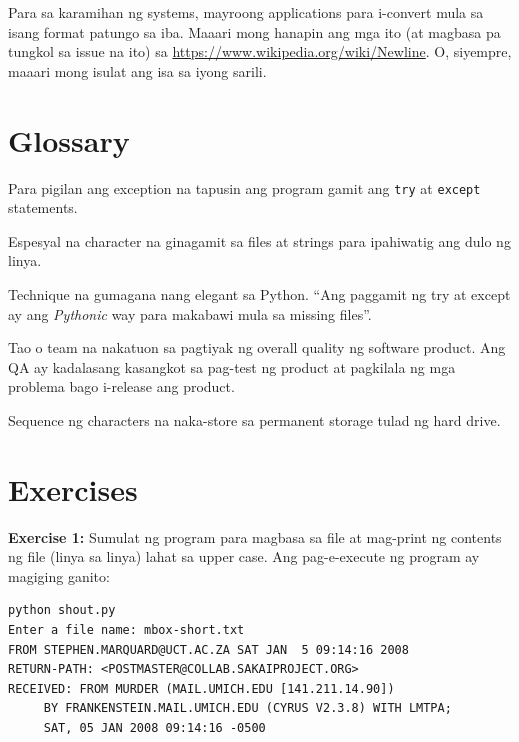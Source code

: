 \documentclass[10pt,]{book}
\providecommand{\tightlist}{%
  \setlength{\itemsep}{0pt}\setlength{\parskip}{0pt}}
\begin{document}

Para sa karamihan ng systems, mayroong applications para i-convert mula
sa isang format patungo sa iba. Maaari mong hanapin ang mga ito (at
magbasa pa tungkol sa issue na ito) sa
\href{https://wikipedia.org/wiki/Newline}{https://www.wikipedia.org/wiki/Newline}.
O, siyempre, maaari mong isulat ang isa sa iyong sarili.

\section{Glossary}\label{glossary-6}

\begin{description}
\tightlist
\item[catch]
Para pigilan ang exception na tapusin ang program gamit ang \texttt{try}
at \texttt{except} statements. 
\item[newline]
Espesyal na character na ginagamit sa files at strings para ipahiwatig
ang dulo ng linya. 
\item[Pythonic]
Technique na gumagana nang elegant sa Python. ``Ang paggamit ng try at
except ay ang \emph{Pythonic} way para makabawi mula sa missing files''.
\item[Quality Assurance]
Tao o team na nakatuon sa pagtiyak ng overall quality ng software
product. Ang QA ay kadalasang kasangkot sa pag-test ng product at
pagkilala ng mga problema bago i-release ang product.
 
\item[text file]
Sequence ng characters na naka-store sa permanent storage tulad ng hard
drive. 
\end{description}

\section{Exercises}\label{exercises-6}

\textbf{Exercise 1:} Sumulat ng program para magbasa sa file at
mag-print ng contents ng file (linya sa linya) lahat sa upper case. Ang
pag-e-execute ng program ay magiging ganito:

{\small
\begin{verbatim}
python shout.py
Enter a file name: mbox-short.txt
FROM STEPHEN.MARQUARD@UCT.AC.ZA SAT JAN  5 09:14:16 2008
RETURN-PATH: <POSTMASTER@COLLAB.SAKAIPROJECT.ORG>
RECEIVED: FROM MURDER (MAIL.UMICH.EDU [141.211.14.90])
     BY FRANKENSTEIN.MAIL.UMICH.EDU (CYRUS V2.3.8) WITH LMTPA;
     SAT, 05 JAN 2008 09:14:16 -0500
\end{verbatim}
}
\end{document}
